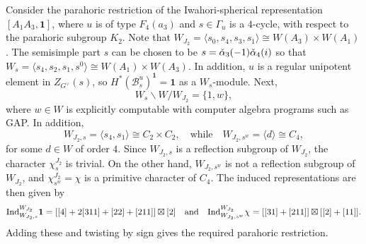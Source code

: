 \begin{example}
    Consider the parahoric restriction of the Iwahori-spherical representation $[A_1A_3,\mathbf{1}]$, where $u$ is of type $F_4(a_3)$ and $s\in\Gamma_u$ is a $4$-cycle, with respect to the parahoric subgroup $K_2$. Note that $W_{J_2}=\langle s_0,s_4,s_3,s_1\rangle\cong W(A_3)\times W(A_1)$. The semisimple part $s$ can be chosen to be $s=\check{\alpha}_3(-1)\check{\alpha}_4(i)$ so that $W_s=\langle s_4,s_2,s_1,s^0\rangle\cong W(A_1)\times W(A_3)$. In addition, $u$ is a regular unipotent element in $Z_{G^\vee}(s)$, so $H^*(\mathcal{B}_s^u)^{\mathbf{1}}=\mathbf{1}$ as a $W_s$-module. Next,
    $$W_s\backslash W/W_{J_2}=\{1,w\},$$
    where $w\in W$ is explicitly computable with computer algebra programs such as GAP. In addition, 
    $$W_{J_2,s}=\langle s_4,s_1\rangle\cong C_2\times C_2,\quad\text{while}\quad W_{J_2,s^w}=\langle d \rangle\cong C_4,$$
    for some $d\in W$ of order $4$. Since $W_{J_2,s}$ is a reflection subgroup of $W_{J_2}$, the character $\chi_s^{J_2}$ is trivial. On the other hand, $W_{J_2,s^w}$ is not a reflection subgroup of $W_{J_2}$, and $\chi_{s^w}^{J_2}=\chi$ is a primitive character of $C_4$. The induced representations are then given by
    \begin{align*}
        \mathrm{Ind}_{W_{J_2,s}}^{W_{J_2}}\mathbf{1}=[[4]+2[311]+[22]+[211]]\boxtimes[2]\quad\text{and}\quad\mathrm{Ind}_{W_{J_2,s^w}}^{W_{J_2}}\chi=[[31]+[211]]\boxtimes[[2]+[11]].
    \end{align*}    
    Adding these and twisting by sign gives the required parahoric restriction.
\end{example}



